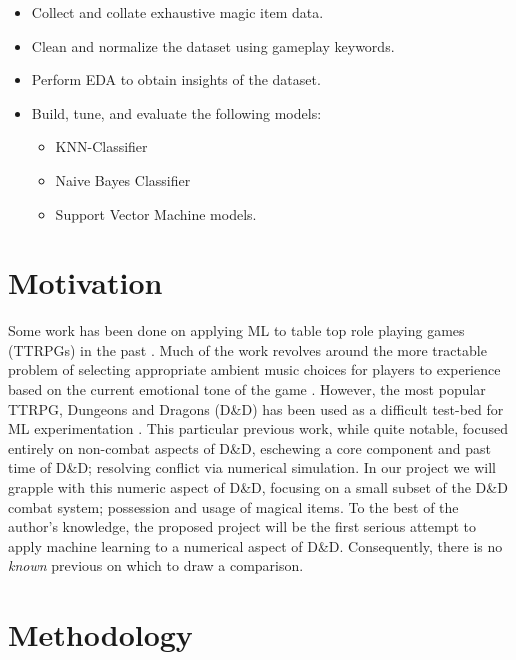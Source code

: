 \documentclass[12pt]{diazessay}
\begin{document}
\begin{itemize}
	
	\item Collect and collate exhaustive magic item data.
	\item Clean and normalize the dataset using gameplay keywords.
	\item Perform EDA to obtain insights of the dataset.
	\item Build, tune, and evaluate the following models:
	\begin{itemize}
		\item KNN-Classifier
		\item Naive Bayes Classifier
		\item Support Vector Machine models.
	\end{itemize}

\end{itemize}

\clearpage


\section*{Motivation}

Some work has been done on applying ML to table top role playing games (TTRPGs) in the past \cite{rameshkumar-bailey-2020-storytelling, macinnes2019d, cavanaugh2016machine, faria2019adaptive, riedl2013interactive}.
Much of the work revolves around the more tractable problem of selecting appropriate ambient music choices for players to experience based on the current emotional tone of the game \cite{ferreira2017mtg, risi2020increasing, padovani2017bardo, ferreira2020computer}.
However, the most popular TTRPG, Dungeons and Dragons (D\&D) has been used as a difficult test-bed for ML experimentation \cite{martin2018dungeons}.
This particular previous work, while quite notable, focused entirely on non-combat aspects of D\&D, eschewing a core component and past time of D\&D; resolving conflict via numerical simulation.
In our project we will grapple with this numeric aspect of D\&D, focusing on a small subset of the D\&D combat system; possession and usage of magical items.
To the best of the author's knowledge, the proposed project will be the first serious attempt to apply machine learning to a numerical aspect of D\&D.
Consequently, there is no \emph{known} previous on which to draw a comparison.


\section*{Methodology}
\end{document}

